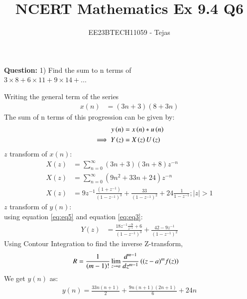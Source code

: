\documentclass[journal,12pt,twocolumn]{IEEEtran}
\theoremstyle{remark}
\begin{document}

\vspace{3cm}

\title{NCERT Mathematics Ex 9.4 Q6}
\author{EE23BTECH11059 - Tejas$^{}$%
}
\maketitle
\newpage
\textbf{Question:}
1) Find the sum to n terms of\\$3 \times 8 + 6 \times 11 + 9 \times 14 + ...$
        

    
    \solution
        
        Writing the general term of the series
        \begin{align}
            x(n)&=(3n+3)(8+3n)  
        \end{align}
        The sum of n terms of this progression can be given by:
        \begin{align}
    y\left(n\right) &= x\left(n\right)*u\left(n\right)\\
    \implies  Y\left(z\right) &= X\left(z\right)U\left(z\right) \label{eq:eq3}
\end{align}
$z$ transform of $x(n)$:
        \begin{align}
            X(z) &= \sum_{n=0}^{\infty} (3n+3)(3n+8)z^{-n} \\
            X(z) &= \sum_{n=0}^{\infty} (9n^2 +33n+24)z^{-n} \\
            X(z)&=9z^{-1}\frac{(1+z^{-1})}{(1-z^{-1})^3} + \frac{33}{(1-z^{-1})^2} +24\frac{1}{1-z^{-1}}; |z|>1    \label{eq:eq5}
        \end{align}
        $z$ transform of $y(n)$:\\
        using equation \eqref{eq:eq5} and equation \eqref{eq:eq3}:
        \begin{align}
            Y(z)&= \frac{18z^{-1}\frac{-9}{z^{-1}}+6}{(1-z^{-1})^3} + \frac{42-9z^{-1}}{(1-z^{-1})^2} 
        \end{align}
        Using Contour Integration to find the inverse Z-transform,
        \begin{align}
            R & =\frac{1}{(m-1) !} \lim _{z \rightarrow a} \frac{d^{m-1}}{d z^{m-1}}\left((z-a)^m f(z)\right)
        \end{align}
        We get $y(n)$ as: 
        \begin{align}
            y(n)=\frac{33n(n+1)}{2}+\frac{9n(n+1)(2 n+1)}{6}+24n
        \end{align}
        
\end{document}
